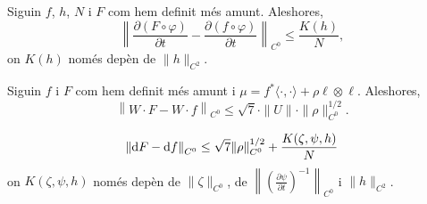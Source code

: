 \begin{lema}
    \label{lema:lema3}
    Siguin $f$, $h$, $N$ i $F$ com hem definit més amunt. Aleshores,
    \begin{equation*}
        \left\|\frac{\partial (F\circ \varphi)}{\partial t}-\frac{\partial (f\circ \varphi)}{\partial t}\right\|_{C^0} \le \frac{K(h)}{N},
    \end{equation*}
    on $K(h)$ només depèn de $\|h\|_{C^2}$.
\end{lema}

\begin{lema}
    \label{lema:lema4}
    Siguin $f$ i $F$ com hem definit més amunt i $\mu = f^*\langle\cdot, \cdot\rangle + \rho\ell\otimes\ell$. Aleshores,
    \begin{equation*}
        \left\|W\cdot F-W\cdot f\right\|_{C^0} \le \sqrt7\cdot\|U\|\cdot\|\rho\|^{1/2}_{C^0}.
    \end{equation*}
\end{lema}


\begin{lema}
    \label{lema:lema6}
    \begin{equation*}
        \left\| \text dF -\text df \right\|_{C^0} \le \sqrt{7}\|\rho\|^{1/2}_{C^0} + \frac{K(\zeta,\psi,h)}{N}
    \end{equation*}
    on $K(\zeta,\psi,h)$ només depèn de $\|\zeta\|_{C^0}$, de $\left\|\left(  \frac{\partial\psi}{\partial t}\right)^{-1}\right\|_{C^0}$ i $\|h\|_{C^2}$.
\end{lema}

